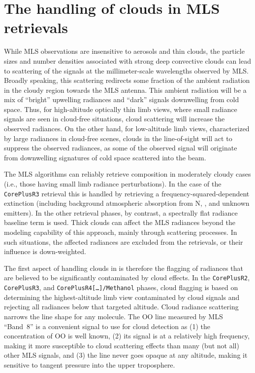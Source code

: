 \section{The handling of clouds in MLS retrievals}
\label{sec:Clouds}
\newcommand{\Tcir}{\ensuremath{T_\text{cir}}}

While MLS observations are insensitive to aerosols and thin clouds, the particle sizes and number densities associated with strong deep convective clouds can lead to scattering of the signals at the millimeter-scale wavelengths observed by MLS.  Broadly speaking, this scattering redirects some fraction of the ambient radiation in the cloudy region towards the MLS antenna. This ambient radiation will be a mix of ``bright'' upwelling radiances and ``dark'' signals downwelling from cold space. Thus, for high-altitude optically thin limb views, where small radiance signals are seen in cloud-free situations, cloud scattering will increase the observed radiances. On the other hand, for low-altitude limb views, characterized by large radiances in cloud-free scenes, clouds in the line-of-sight will act to suppress the observed radiances, as some of the observed signal will originate from downwelling signatures of cold space scattered into the beam.

The MLS \thisv algorithms can reliably retrieve composition in moderately cloudy cases (i.e., those having small limb radiance perturbations).  In the case of the \texttt{CorePlusR3} retrieval this is handled by retrieving a frequency-squared-dependent extinction (including background atmospheric absorption from N, , and unknown emitters). In the other retrieval phases, by contrast, a spectrally flat radiance baseline term is used. Thick clouds can affect the MLS radiances beyond the modeling capability of this approach, mainly through scattering processes. In such situations, the affected radiances are excluded from the retrievals, or their influence is down-weighted.

The first aspect of handling clouds in \thisv is therefore the flagging of radiances that are believed to be significantly contaminated by cloud effects.   In the \texttt{CorePlusR2}, \texttt{CorePlusR3}, and \texttt{CorePlusR4[\ldots]/\texttt{Methanol}} phases, cloud flagging is based on determining the highest-altitude limb view contaminated by cloud signals and rejecting all radiances below that targeted altitude.  Cloud radiance scattering narrows the line shape for any molecule.  The OO line measured by MLS ``Band~8'' is a convenient signal to use for cloud detection as (1) the concentration of OO is well known, (2) its signal is at a relatively high frequency, making it more susceptible to cloud scattering effects than many (but not all) other MLS signals, and (3) the line never goes opaque at any altitude, making it sensitive to tangent pressure into the upper troposphere.

